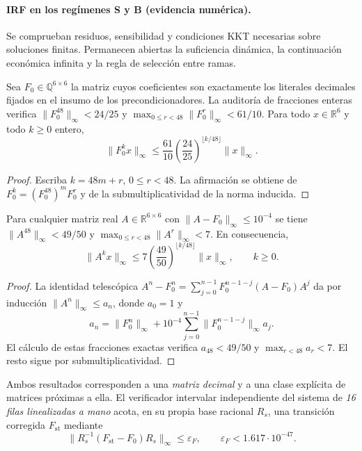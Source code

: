 \paragraph{IRF en los regímenes S y B (evidencia numérica).}
Se comprueban residuos, sensibilidad y condiciones KKT
necesarias sobre soluciones finitas. Permanecen abiertas
la suficiencia dinámica, la continuación económica infinita y
la regla de selección entre ramas.

\begin{proposition}
\label{prop:compact_exact_tail_power}
Sea $F_0\in\mathbb{Q}^{6\times6}$ la matriz cuyos coeficientes
son exactamente los literales decimales fijados en el insumo
de los precondicionadores. La auditoría de fracciones enteras
verifica $\|F_0^{48}\|_\infty<24/25$ y
$\max_{0\le r<48}\|F_0^r\|_\infty<61/10$.
Para todo $x\in\mathbb{R}^6$ y todo $k\ge0$ entero,
\[
 \|F_0^kx\|_\infty\le\frac{61}{10}
 \left(\frac{24}{25}\right)^{\lfloor k/48\rfloor}
 \|x\|_\infty.
\]
\end{proposition}
\begin{proof}
Escriba $k=48m+r$, $0\le r<48$. La afirmación se obtiene
de $F_0^k=(F_0^{48})^mF_0^r$ y de la submultiplicatividad
de la norma inducida.
\end{proof}
\begin{lemma}
\label{lem:compact_robust_tail_power}
Para cualquier matriz real $A\in\mathbb R^{6\times6}$ con
$\|A-F_0\|_\infty\le10^{-4}$ se tiene
$\|A^{48}\|_\infty<49/50$ y
$\max_{0\le r<48}\|A^r\|_\infty<7$.
En consecuencia,
\[
 \|A^kx\|_\infty
 \le 7\left(\frac{49}{50}\right)^{\lfloor k/48\rfloor}
 \|x\|_\infty,\qquad k\ge0.
\]
\end{lemma}
\begin{proof}
La identidad telescópica
$A^n-F_0^n=\sum_{j=0}^{n-1}F_0^{n-1-j}(A-F_0)A^j$
da por inducción $\|A^n\|_\infty\le a_n$, donde
$a_0=1$ y
\[
 a_n=\|F_0^n\|_\infty+
 10^{-4}\sum_{j=0}^{n-1}
 \|F_0^{n-1-j}\|_\infty a_j.
\]
El cálculo de estas fracciones exactas verifica
$a_{48}<49/50$ y $\max_{r<48}a_r<7$.
El resto sigue por submultiplicatividad.
\end{proof}
Ambos resultados corresponden a una \emph{matriz decimal}
y a una clase explícita de matrices próximas a ella.
El verificador intervalar independiente del sistema de
\emph{16 filas linealizadas a mano} acota, en su propia
base racional $R_s$, una transición corregida
$F_{\mathrm{st}}$ mediante
\[
 \bigl\|R_s^{-1}(F_{\mathrm{st}}-F_0)R_s\bigr\|_\infty
 \le \varepsilon_F,\qquad
 \varepsilon_F<1.617\cdot10^{-47}.
\]
